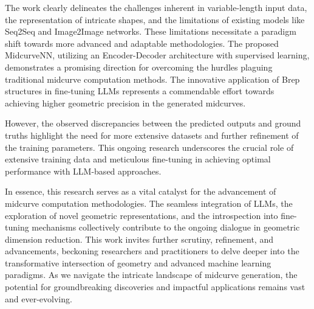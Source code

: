 \documentclass[conference]{IEEEtran}
\begin{document}
The work clearly delineates the challenges inherent in variable-length input data, the representation of intricate shapes, and the limitations of existing models like Seq2Seq and Image2Image networks. These limitations necessitate a paradigm shift towards more advanced and adaptable methodologies.
The proposed MidcurveNN, utilizing an Encoder-Decoder architecture with supervised learning, demonstrates a promising direction for overcoming the hurdles plaguing traditional midcurve computation methods. The innovative application of Brep structures in fine-tuning LLMs represents a commendable effort towards achieving higher geometric precision in the generated midcurves.

However, the observed discrepancies between the predicted outputs and ground truths highlight the need for more extensive datasets and further refinement of the training parameters. This ongoing research underscores the crucial role of extensive training data and meticulous fine-tuning in achieving optimal performance with LLM-based approaches.


In essence, this research serves as a vital catalyst for the advancement of midcurve computation methodologies. The seamless integration of LLMs, the exploration of novel geometric representations, and the introspection into fine-tuning mechanisms collectively contribute to the ongoing dialogue in geometric dimension reduction. This work invites further scrutiny, refinement, and advancements, beckoning researchers and practitioners to delve deeper into the transformative intersection of geometry and advanced machine learning paradigms. As we navigate the intricate landscape of midcurve generation, the potential for groundbreaking discoveries and impactful applications remains vast and ever-evolving.






\end{document}
